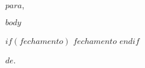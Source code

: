 \documentclass[a4paper, 11pt]{letter}
\begin{document}
\begin{letter}{}

  \opening{$para$,}

  \hspace{3cm}

  $body$

  \vspace{0.3cm}
  \hspace{1cm}
  $if(fechamento)$
  \noindent $fechamento$
  $endif$
  \vspace{0.3cm}

  \hfill $de$.

\end{letter}
\end{document}
